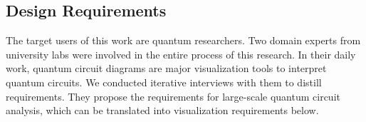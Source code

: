 

\subsection{Design Requirements}
\label{sec:requirements}
The target users of this work are quantum researchers.
Two domain experts from university labs were involved in the entire process of this research.
In their daily work, quantum circuit diagrams are major visualization tools to interpret quantum circuits.
We conducted iterative interviews with them to distill requirements. 
They propose the requirements for large-scale quantum circuit analysis, which can be translated into visualization requirements below.

